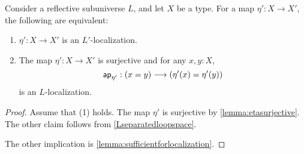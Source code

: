 \begin{thm}\label{theorem:commutativityloopreflectivesubuniv}
Consider a reflective subuniverse $L$, and let $X$ be a type.
For a map $\eta':X\to X'$, the following are equivalent:
\begin{enumerate}
\item $\eta':X\to X'$ is an $L'$-localization.
\item The map $\eta':X\to X'$ is surjective and for any $x,y:X$,
\[
  \mathsf{ap}_{\eta'}:(x=y) \longrightarrow (\eta'(x)=\eta'(y))
\]
is an $L$-localization.
\end{enumerate}
\end{thm}

\begin{proof}
Assume that (1) holds.
The map $\eta'$ is surjective by \cref{lemma:etasurjective}.
The other claim follows from \cref{Lseparatedloopspace}.

The other implication is \cref{lemma:sufficientforlocalization}.
\end{proof}
